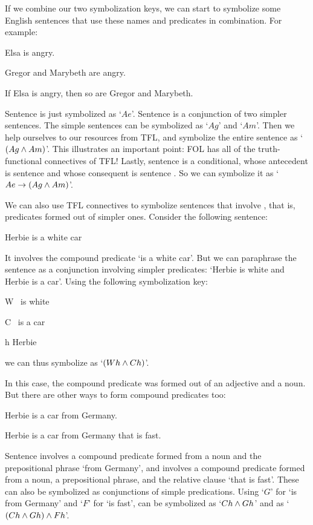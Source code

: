 If we combine our two symbolization keys, we can start to symbolize some English sentences that use these names and predicates in combination. For example:
	\begin{earg}
		\item[\ex{terms1}] Elsa is angry.
		\item[\ex{terms2a}] Gregor and Marybeth are angry.
		\item[\ex{terms2}] If Elsa is angry, then so are Gregor and Marybeth.
	\end{earg}
Sentence  is just symbolized as `$Ae$'.  Sentence  is a conjunction of two simpler sentences. The simple sentences can be symbolized as `$Ag$' and `$Am$'. Then we help ourselves to our resources from TFL, and symbolize the entire sentence as `$(Ag \wedge Am)$'. This illustrates an important point: FOL has all of the truth-functional connectives of TFL!  Lastly, sentence  is a conditional, whose antecedent is sentence  and whose consequent is sentence . So we can symbolize it as `$Ae \rightarrow (Ag \wedge Am)$'.


We can also use TFL connectives to symbolize sentences that involve , that is, predicates formed out of simpler ones.  Consider the following sentence:
	\begin{earg}
		\item[\ex{syn1}] Herbie is a white car
	\end{earg}
It involves the compound predicate `\blank is a white car'.  But we can paraphrase the sentence as a conjunction involving simpler predicates: `Herbie is white and Herbie is a car'. Using the following symbolization key:
	\begin{ekey}
		\item[W] \blank\ is white
		\item[C] \blank\ is a car
		\item[h] Herbie
	\end{ekey}
we can thus symbolize   as `$(Wh \wedge Ch)$'.

In this case, the compound predicate was formed out of an adjective and a noun.  But there are other ways to form compound predicates too:
	\begin{earg}
		\item[\ex{cp1}] Herbie is a car from Germany.
		\item[\ex{cp2}] Herbie is a car from Germany that is fast.
	\end{earg}
Sentence  involves a compound predicate formed from a noun and the prepositional phrase `from Germany', and  involves a compound predicate formed from a noun, a prepositional phrase, and the relative clause `that is fast'.  These can also be symbolized as conjunctions of simple predications.  Using `$G$' for `\blank is from Germany' and `$F$' for `\blank is fast',  can be symbolized as `$Ch \wedge Gh$' and  as `$(Ch \wedge Gh) \wedge Fh$'.


